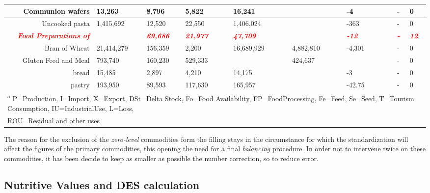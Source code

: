 \documentclass[]{article}
\begin{document}
\begin{landscape}
\begin{table}
{\begin{tabular}[t]{r|l|l|l|l|l|l|l|l|l|l|l|l|l}
\hline
Communion wafers & 13,263 & 8,796 & 5,822 &  & 16,241 &  &  &  & -4 &  &  & - & 0\\
\hline
Uncooked pasta & 1,415,692 & 12,520 & 22,550 &  & 1,406,024 &  &  &  & -363 &  &  & - & 0\\
\hline
\textcolor{red}{\em{\textbf{Food Preparations of}}} & \textcolor{red}{\em{\textbf{}}} & \textcolor{red}{\em{\textbf{69,686}}} & \textcolor{red}{\em{\textbf{21,977}}} & \textcolor{red}{\em{\textbf{}}} & \textcolor{red}{\em{\textbf{47,709}}} & \textcolor{red}{\em{\textbf{}}} & \textcolor{red}{\em{\textbf{}}} & \textcolor{red}{\em{\textbf{}}} & \textcolor{red}{\em{\textbf{-12}}} & \textcolor{red}{\em{\textbf{}}} & \textcolor{red}{\em{\textbf{}}} & \textcolor{red}{\em{\textbf{-}}} & \textcolor{red}{\em{\textbf{12}}}\\
\hline
Bran of Wheat & 21,414,279 & 156,359 & 2,200 &  & 16,689,929 &  & 4,882,810 &  & -4,301 &  &  & - & 0\\
\hline
Gluten Feed and Meal & 793,740 & 160,230 & 529,333 &  &  &  & 424,637 &  &  &  &  & - & 0\\
\hline
bread & 15,485 & 2,897 & 4,210 &  & 14,175 &  &  &  & -3 &  &  & - & 0\\
\hline
pastry & 193,950 & 89,593 & 117,630 &  & 165,957 &  &  &  & -42.75 &  &  & - & 0\\
\hline
\multicolumn{14}{l}{\textsuperscript{a} P=Production, I=Import, X=Export, DSt=Delta Stock, Fo=Food Availability, FP=FoodProcessing, Fe=Feed, Se=Seed, T=Tourism Consumption, IU=IndustrialUse, L=Loss,}\\
\multicolumn{14}{l}{ROU=Residual and other uses}\\
\end{tabular}}
\end{table}
\end{landscape}

The reason for the exclusion of the \emph{zero-level} commodities form
the filling stays in the circumstance for which the standardization will
affect the figures of the primary commodities, this opening the need for
a final \emph{balancing} procedure. In order not to intervene twice on
these commodities, it has been decide to keep as smaller as possible the
number correction, so to reduce error.

\subsection*{Nutritive Values and DES
calculation}\label{nutritive-values-and-des-calculation}
\end{document}
